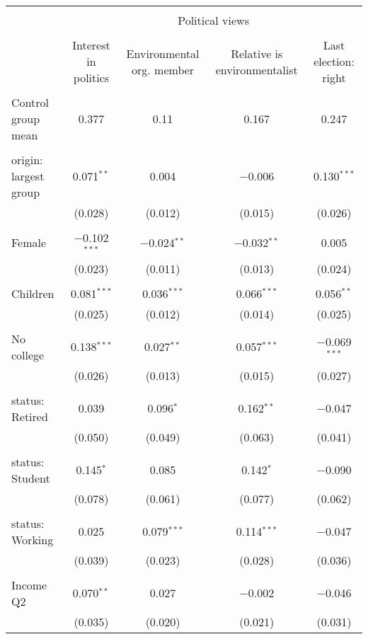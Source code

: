 
\begin{tabular}{@{\extracolsep{5pt}}lcccc} 
\\[-1.8ex]\hline 
\hline \\[-1.8ex] 
 & \multicolumn{4}{c}{Political views} \\ 
\cline{2-5} 
\\[-1.8ex] & Interest in politics & Environmental org. member & Relative is environmentalist & Last election: right \\ 
\hline \\[-1.8ex] 
 Control group mean & 0.377 & 0.11 & 0.167 & 0.247  \\ \hline \\[-1.8ex] origin: largest group & 0.071$^{**}$ & 0.004 & $-$0.006 & 0.130$^{***}$ \\ 
  & (0.028) & (0.012) & (0.015) & (0.026) \\ 
  & & & & \\ 
 Female & $-$0.102$^{***}$ & $-$0.024$^{**}$ & $-$0.032$^{**}$ & 0.005 \\ 
  & (0.023) & (0.011) & (0.013) & (0.024) \\ 
  & & & & \\ 
 Children & 0.081$^{***}$ & 0.036$^{***}$ & 0.066$^{***}$ & 0.056$^{**}$ \\ 
  & (0.025) & (0.012) & (0.014) & (0.025) \\ 
  & & & & \\ 
 No college & 0.138$^{***}$ & 0.027$^{**}$ & 0.057$^{***}$ & $-$0.069$^{***}$ \\ 
  & (0.026) & (0.013) & (0.015) & (0.027) \\ 
  & & & & \\ 
 status: Retired & 0.039 & 0.096$^{*}$ & 0.162$^{**}$ & $-$0.047 \\ 
  & (0.050) & (0.049) & (0.063) & (0.041) \\ 
  & & & & \\ 
 status: Student & 0.145$^{*}$ & 0.085 & 0.142$^{*}$ & $-$0.090 \\ 
  & (0.078) & (0.061) & (0.077) & (0.062) \\ 
  & & & & \\ 
 status: Working & 0.025 & 0.079$^{***}$ & 0.114$^{***}$ & $-$0.047 \\ 
  & (0.039) & (0.023) & (0.028) & (0.036) \\ 
  & & & & \\ 
 Income Q2 & 0.070$^{**}$ & 0.027 & $-$0.002 & $-$0.046 \\ 
  & (0.035) & (0.020) & (0.021) & (0.031) \\ 

\end{tabular}
